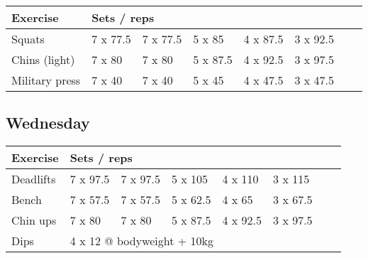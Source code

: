 \documentclass[12pt, a4paper]{article}%
\begin{document}
  \begin{tabular}{l|lllllll}
  \hspace{0.75em} \textbf{Exercise} & \multicolumn{ 7 }{l}{ \textbf{Sets / reps} } \\ \hline

            \hspace{0.75em} Squats
            & 7 x 77.5
            & 7 x 77.5
            & 5 x 85
            & 4 x 87.5
            & 3 x 92.5
            & 
            & 
            \\


            \hspace{0.75em} Chins (light)
            & 7 x 80
            & 7 x 80
            & 5 x 87.5
            & 4 x 92.5
            & 3 x 97.5
            & 
            & 
            \\


            \hspace{0.75em} Military press
            & 7 x 40
            & 7 x 40
            & 5 x 45
            & 4 x 47.5
            & 3 x 47.5
            & 
            & 
            \\


  \end{tabular}

  \subsection*{\hspace{0.5em} Wednesday }


  \begin{tabular}{l|lllllll}
  \hspace{0.75em} \textbf{Exercise} & \multicolumn{ 7 }{l}{ \textbf{Sets / reps} } \\ \hline

            \hspace{0.75em} Deadlifts
            & 7 x 97.5
            & 7 x 97.5
            & 5 x 105
            & 4 x 110
            & 3 x 115
            & 
            & 
            \\


            \hspace{0.75em} Bench
            & 7 x 57.5
            & 7 x 57.5
            & 5 x 62.5
            & 4 x 65
            & 3 x 67.5
            & 
            & 
            \\


            \hspace{0.75em} Chin ups
            & 7 x 80
            & 7 x 80
            & 5 x 87.5
            & 4 x 92.5
            & 3 x 97.5
            & 
            & 
            \\


   \hspace{0.75em} Dips &  \multicolumn{ 7 }{l}{ 4 x 12 @ bodyweight + 10kg } \\
  \end{tabular}
\end{document}
